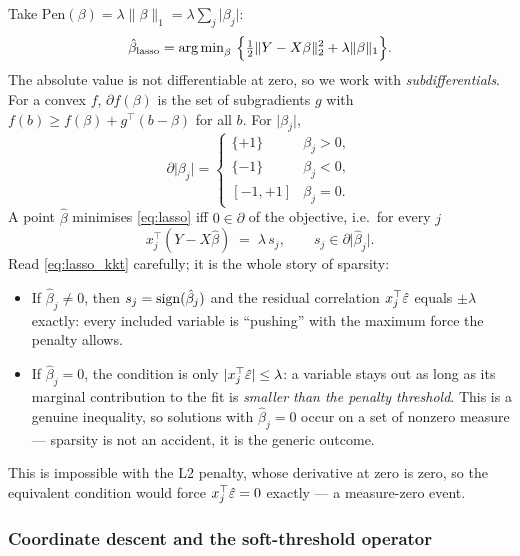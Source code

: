 Take $\mathrm{Pen}(\beta)=\lambda\lVert\beta\rVert_1=\lambda\sum_j\lvert\beta_j\rvert$:
\begin{equation}
  \hat\beta_{\text{lasso}} = \argmin_\beta\ \Bigl\{\tfrac12\lVert Y-X\beta\rVert_2^2
  + \lambda\lVert\beta\rVert_1\Bigr\}.
  \label{eq:lasso}
\end{equation}
The absolute value is not differentiable at zero, so we work with \emph{subdifferentials}.
For a convex $f$, $\partial f(\beta)$ is the set of subgradients $g$ with
$f(b)\ge f(\beta)+g^{\top}(b-\beta)$ for all $b$. For $\lvert\beta_j\rvert$,
\[
  \partial\lvert\beta_j\rvert =
  \begin{cases}
    \{+1\} & \beta_j>0,\\
    \{-1\} & \beta_j<0,\\
    [-1,+1] & \beta_j=0 .
  \end{cases}
\]
A point $\hat\beta$ minimises \eqref{eq:lasso} iff $0\in\partial$ of the objective, i.e.\
for every $j$
\begin{equation}
  x_j^{\top}(Y-X\hat\beta) \;=\; \lambda\, s_j,
  \qquad
  s_j \in \partial\lvert\hat\beta_j\rvert .
  \label{eq:lasso_kkt}
\end{equation}
Read \eqref{eq:lasso_kkt} carefully; it is the whole story of sparsity:
\begin{itemize}
  \item If $\hat\beta_j\ne0$, then $s_j=\operatorname{sign}(\hat\beta_j)$ and the residual correlation
    $x_j^{\top}\hat{\varepsilon}$ equals $\pm\lambda$ exactly: every included variable is
    ``pushing'' with the maximum force the penalty allows.
  \item If $\hat\beta_j=0$, the condition is only
    $\lvert x_j^{\top}\hat{\varepsilon}\rvert\le\lambda$: a variable stays out as long as its
    marginal contribution to the fit is \emph{smaller than the penalty threshold}. This
    is a genuine inequality, so solutions with $\hat\beta_j=0$ occur on a set of nonzero
    measure --- sparsity is not an accident, it is the generic outcome.
\end{itemize}
This is impossible with the L2 penalty, whose derivative at zero is zero, so the
equivalent condition would force $x_j^{\top}\hat{\varepsilon}=0$ exactly --- a measure-zero event.

\subsubsection{Coordinate descent and the soft-threshold operator}
\label{sec:lasso:cd}

